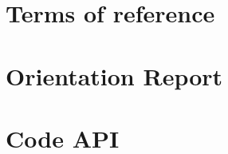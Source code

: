 \chapter{Terms of reference}
\label{sec:terms}


\chapter{Orientation Report}
\label{sec:orientation}


\chapter{Code API}
\label{sec:Doxygen}

